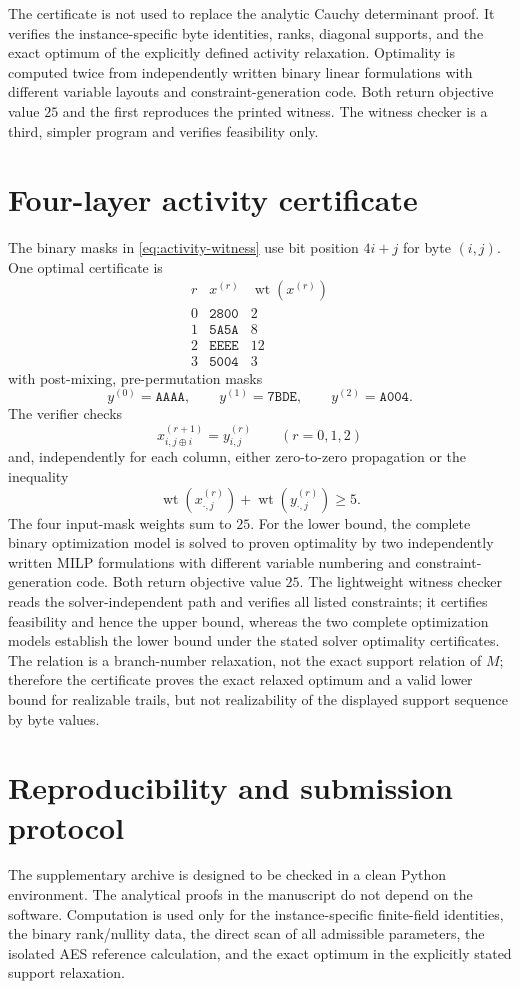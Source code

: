 \documentclass[10pt,reqno]{amsart}
\theoremstyle{plain}
\theoremstyle{remark}\newtheorem{remark}[theorem]{Remark}
\theoremstyle{definition}\newtheorem{definition}[theorem]{Definition}
\begin{document}
The certificate is not used to replace the analytic Cauchy determinant proof. It verifies the instance-specific byte identities, ranks, diagonal supports, and the exact optimum of the explicitly defined activity relaxation. Optimality is computed twice from independently written binary linear formulations with different variable layouts and constraint-generation code. Both return objective value $25$ and the first reproduces the printed witness. The witness checker is a third, simpler program and verifies feasibility only.

\section{Four-layer activity certificate}\label{app:activity-witness}
The binary masks in \eqref{eq:activity-witness} use bit position $4i+j$ for byte $(i,j)$. One optimal certificate is
\[
\begin{array}{c|c|c}
r & x^{(r)} & \operatorname{wt}(x^{(r)})\\
\hline
0&\mathtt{2800}&2\\
1&\mathtt{5A5A}&8\\
2&\mathtt{EEEE}&12\\
3&\mathtt{5004}&3
\end{array}
\]
with post-mixing, pre-permutation masks
\[
y^{(0)}=\mathtt{AAAA},\qquad
y^{(1)}=\mathtt{7BDE},\qquad
y^{(2)}=\mathtt{A004}.
\]
The verifier checks
\[
x^{(r+1)}_{i,j\oplus i}=y^{(r)}_{i,j}
\qquad (r=0,1,2)
\]
and, independently for each column, either zero-to-zero propagation or the inequality
\[
\operatorname{wt}(x^{(r)}_{\cdot,j})+
\operatorname{wt}(y^{(r)}_{\cdot,j})\ge5.
\]
The four input-mask weights sum to $25$. For the lower bound, the complete binary optimization model is solved to proven optimality by two independently written MILP formulations with different variable numbering and constraint-generation code. Both return objective value $25$. The lightweight witness checker reads the solver-independent path and verifies all listed constraints; it certifies feasibility and hence the upper bound, whereas the two complete optimization models establish the lower bound under the stated solver optimality certificates. The relation is a branch-number relaxation, not the exact support relation of $M$; therefore the certificate proves the exact relaxed optimum and a valid lower bound for realizable trails, but not realizability of the displayed support sequence by byte values.

\section{Reproducibility and submission protocol}\label{app:reproducibility}
The supplementary archive is designed to be checked in a clean Python environment.  The analytical proofs in the manuscript do not depend on the software.  Computation is used only for the instance-specific finite-field identities, the binary rank/nullity data, the direct scan of all admissible parameters, the isolated AES reference calculation, and the exact optimum in the explicitly stated support relaxation.
\end{document}
